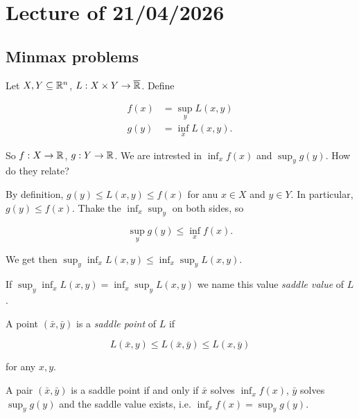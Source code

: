 \chapter{Lecture \thechapter{} of 21/04/2026}

\section{Minmax problems}

Let $X,Y \subseteq {\mathbb{R}^n}$, $L : X \times Y \to \overline{\mathbb{R}}$. Define

\begin{align*}
    f(x) &= \sup_y L(x,y) \\
    g(y) &= \inf_x L(x,y).
\end{align*}

So $f : X \to \mathbb{R}$, $g : Y \to \mathbb{R}$. We are intrested in $\inf_x f(x)$ and $\sup_y g(y)$. How do they relate?

\begin{remark}
    
    By definition, $g(y) \le L(x,y) \le f(x)$ for anu $x \in X$ and $y \in Y$. In particular, $g(y) \le f(x)$. Thake the $\inf_x\sup_y$ on both sides, so 

    \[ \sup_y g(y) \le \inf_x f(x). \]

    We get then $\sup_y \inf_x L(x,y) \le \inf_x \sup_y L(x,y)$.

\end{remark}

\begin{definition}
    
    If $\sup_y \inf_x L(x,y) = \inf_x \sup_y L(x,y)$ we name this value \emph{saddle value} of $L$.

\end{definition}

\begin{definition}
    
    A point $(\bar{x},\bar{y})$ is a \emph{saddle point} of $L$ if

    \[ L(\bar{x},y) \le L(\bar{x},\bar{y}) \le L(x,\bar{y}) \]

    for any $x,y$.

\end{definition}

\begin{theorem}
    
    A pair $(\bar{x},\bar{y})$ is a saddle point if and only if $\bar{x}$ solves $\inf_x f(x)$, $\bar{y}$ solves $\sup_y g(y)$ and the saddle value exists, i.e. $\inf_x f(x) = \sup_y g(y)$.

\end{theorem}

